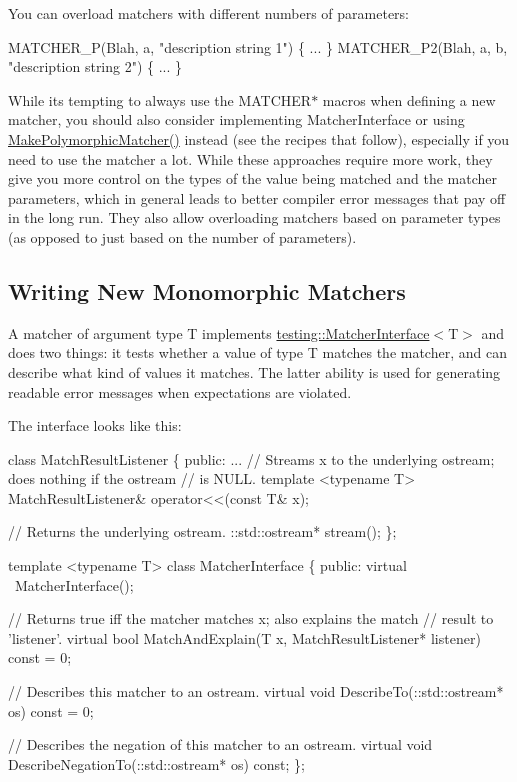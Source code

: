 You can overload matchers with different numbers of parameters\+: 
\begin{DoxyCode}
MATCHER\_P(Blah, a, "description string 1") \{ ... \}
MATCHER\_P2(Blah, a, b, "description string 2") \{ ... \}
\end{DoxyCode}


While it\textquotesingle{}s tempting to always use the {\ttfamily M\+A\+T\+C\+H\+E\+R$\ast$} macros when defining a new matcher, you should also consider implementing {\ttfamily Matcher\+Interface} or using {\ttfamily \hyperlink{namespacetesting_a667ca94f190ec2e17ee2fbfdb7d3da04}{Make\+Polymorphic\+Matcher()}} instead (see the recipes that follow), especially if you need to use the matcher a lot. While these approaches require more work, they give you more control on the types of the value being matched and the matcher parameters, which in general leads to better compiler error messages that pay off in the long run. They also allow overloading matchers based on parameter types (as opposed to just based on the number of parameters).

\subsection*{Writing New Monomorphic Matchers}

A matcher of argument type {\ttfamily T} implements {\ttfamily \hyperlink{classtesting_1_1MatcherInterface}{testing\+::\+Matcher\+Interface}$<$T$>$} and does two things\+: it tests whether a value of type {\ttfamily T} matches the matcher, and can describe what kind of values it matches. The latter ability is used for generating readable error messages when expectations are violated.

The interface looks like this\+:


\begin{DoxyCode}
class MatchResultListener \{
 public:
  ...
  // Streams x to the underlying ostream; does nothing if the ostream
  // is NULL.
  template <typename T>
  MatchResultListener& operator<<(const T& x);

  // Returns the underlying ostream.
  ::std::ostream* stream();
\};

template <typename T>
class MatcherInterface \{
 public:
  virtual ~MatcherInterface();

  // Returns true iff the matcher matches x; also explains the match
  // result to 'listener'.
  virtual bool MatchAndExplain(T x, MatchResultListener* listener) const = 0;

  // Describes this matcher to an ostream.
  virtual void DescribeTo(::std::ostream* os) const = 0;

  // Describes the negation of this matcher to an ostream.
  virtual void DescribeNegationTo(::std::ostream* os) const;
\};
\end{DoxyCode}


